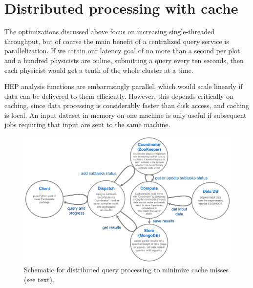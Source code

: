 \documentclass[a4paper]{jpconf}
\begin{document}
\section{Distributed processing with cache}

The optimizations discussed above focus on increasing single-threaded throughput, but of course the main benefit of a centralized query service is parallelization. If we attain our latency goal of no more than a second per plot and a hundred physicists are online, submitting a query every ten seconds, then each physicist would get a tenth of the whole cluster at a time.

HEP analysis functions are embarrasingly parallel, which would scale linearly if data can be delivered to them efficiently. However, this depends critically on caching, since data processing is considerably faster than disk access, and caching is local. An input dataset in memory on one machine is only useful if subsequent jobs requiring that input are sent to the same machine.

\begin{figure}[b]
\begin{center}
\includegraphics[width=0.9\linewidth]{distributed-layout.png}
\end{center}

\caption{\label{fig:distributed} Schematic for distributed query processing to minimize cache misses (see text).}
\end{figure}
\end{document}

